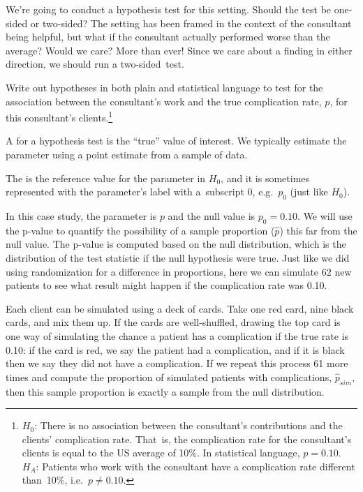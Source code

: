 \begin{example}{We're going to conduct a hypothesis test for this setting. Should the test be one-sided or two-sided?}
The setting has been framed in the context of the consultant being helpful, but what if the consultant actually performed worse than the average? Would we care? More than ever! Since we care about a finding in either direction, we should run a two-sided~test.
\end{example}

\begin{exercise}\label{hypForAssessingConsultantWorkInLiverTransplants}
Write out hypotheses in both plain and statistical language to test for the association between the consultant's work and the true complication rate, $p$, for this consultant's clients.\footnote{$H_0$: There is no association between the consultant's contributions and the clients' complication rate. That~is, the complication rate for the consultant's clients is equal to the US average of 10\%. In statistical language, $p=0.10$. $H_A$: Patients who work with the consultant have a complication rate different than~10\%, i.e.~$p \neq 0.10$.}
\end{exercise}

\begin{termBox}{
A  for a hypothesis test is the ``true'' value of interest. We typically estimate the parameter using a point estimate from a sample of data.}
\end{termBox}

\begin{termBox}{
The  is the reference value for the parameter in $H_0$, and it is sometimes represented with the parameter's label with a~subscript 0, e.g.~$p_0$ (just like $H_0$).}
\end{termBox}

In this case study, the parameter is $p$ and the null value is $p_0 = 0.10$. We will use the p-value to quantify the possibility of a sample proportion ($\hat{p}$) this far from the null value. The p-value is computed based on the null distribution, which is the distribution of the test statistic if the null hypothesis were true. Just like we did using randomization for a difference in proportions, here we can simulate 62 new patients to see what result might happen if the complication rate was 0.10.

Each client can be simulated using a deck of cards. Take one red card, nine black cards, and mix them up. If the cards are well-shuffled, drawing the top card is one way of simulating the chance a patient has a complication if the true rate is 0.10: if the card is red, we say the patient had a complication, and if it is black then we say they did not have a complication. If we repeat this process 61 more times and compute the proportion of simulated patients with complications, $\hat{p}_{sim}$, then this sample proportion is exactly a sample from the null distribution.

